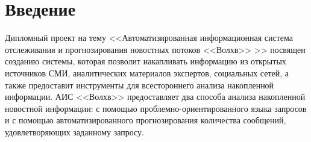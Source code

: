 \section*{Введение}

Дипломный проект на тему <<Автоматизированная информационная система отслеживания и прогнозирования новостных потоков <<Волхв>> >> посвящен созданию системы, которая позволит накапливать информацию из открытых источников СМИ, аналитических материалов экспертов, социальных сетей, а также предоставит инструменты для всестороннего анализа накопленной информации. АИС <<Волхв>> предоставляет два способа анализа накопленной новостной информации: с помощью проблемно-ориентированного языка запросов и с помощью автоматизированного прогнозирования количества сообщений, удовлетворяющих заданному запросу.

